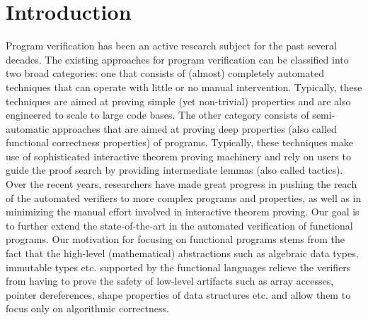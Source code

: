 \section{Introduction}

Program verification has been an active research subject for the past several decades.
The existing approaches for program verification can be classified into two broad categories: one that 
consists of (almost) completely automated techniques that can operate with little or no manual
intervention. Typically, these techniques are aimed at proving simple (yet non-trivial) properties
and are also engineered to scale to large code bases. 
The other category consists of semi-automatic approaches that are aimed at proving deep properties 
(also called functional correctness properties) of programs. 
Typically, these techniques make use of sophisticated interactive theorem proving machinery
and rely on users to guide the proof search by providing intermediate lemmas (also called tactics).
Over the recent years, researchers have made great progress in pushing the reach of the 
automated verifiers to more complex programs and properties, as well as in minimizing the manual effort 
involved in interactive theorem proving. 
Our goal is to further extend the state-of-the-art in the automated verification of functional programs.
Our motivation for focusing on functional programs stems from the fact that the high-level (mathematical) abstractions 
such as algebraic data types, immutable types etc. supported by the functional languages relieve the verifiers 
from having to prove the safety of low-level artifacts such as array accesses, pointer dereferences,
shape properties of data structures etc. 
and allow them to focus only on algorithmic correctness.

